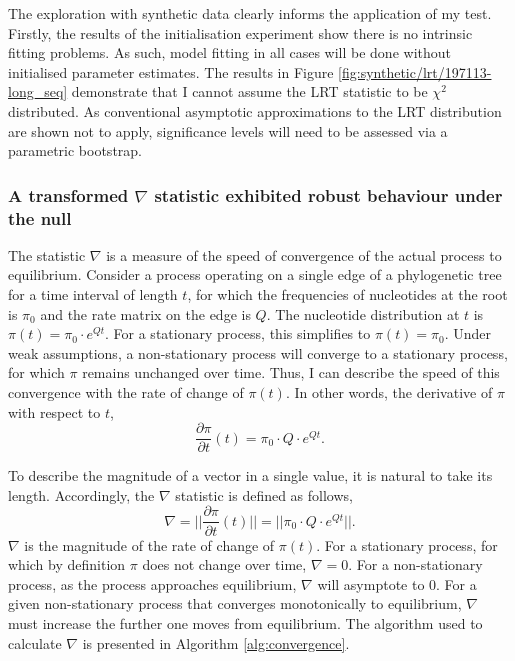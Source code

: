 

The exploration with synthetic data clearly informs the application of my test. Firstly, the results of the initialisation experiment show there is no intrinsic fitting problems. As such, model fitting in all cases will be done without initialised parameter estimates. The results in Figure \ref{fig:synthetic/lrt/197113-long_seq} demonstrate that I cannot assume the LRT statistic to be $\chi^{2}$ distributed. As conventional asymptotic approximations to the LRT distribution are shown not to apply, significance levels will need to be assessed via a parametric bootstrap. 

\subsubsection*{A transformed $\nabla$ statistic exhibited robust behaviour under the null}

The statistic $\nabla$ is a measure of the speed of convergence of the actual process to equilibrium. Consider a process operating on a single edge of a phylogenetic tree for a time interval of length $t$, for which the frequencies of nucleotides at the root is $\pi_0$ and the rate matrix on the edge is $Q$. The nucleotide distribution at $t$ is $\pi(t) = \pi_{0} \cdot e^{Qt}$. For a stationary process, this simplifies to $\pi(t) = \pi_{0}$. Under weak assumptions, a non-stationary process will converge to a stationary process, for which $\pi$ remains unchanged over time. Thus, I can describe the speed of this convergence with the rate of change of $\pi(t)$. In other words, the derivative of $\pi$ with respect to $t$,
\begin{equation}
\label{eq:dpi/dt}
\frac{\partial \pi}{\partial t}(t) = \pi_{0} \cdot Q \cdot e^{Qt}.
\end{equation}

To describe the magnitude of a vector in a single value, it is natural to take its length. Accordingly, the $\nabla$ statistic is defined as follows,
\begin{equation}
\label{eq:len-dpi/dt}
\nabla = ||\frac{\partial \pi}{\partial t}(t)|| =|| \pi_{0} \cdot Q \cdot e^{Qt}||.
\end{equation}
$\nabla$ is the magnitude of the rate of change of $\pi(t)$. For a stationary process, for which by definition $\pi$ does not change over time, $\nabla = 0$. For a non-stationary process, as the process approaches equilibrium, $\nabla$ will asymptote to $0$. For a given non-stationary process that converges monotonically to equilibrium, $\nabla$ must increase the further one moves from equilibrium. The algorithm used to calculate $\nabla$ is presented in Algorithm \ref{alg:convergence}.

